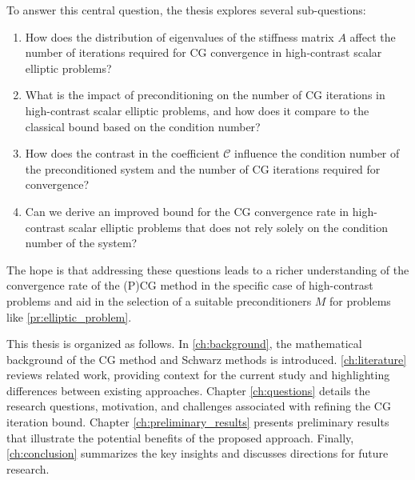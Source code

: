 To answer this central question, the thesis explores several sub-questions:
\begin{enumerate}
    \item How does the distribution of eigenvalues of the stiffness matrix \( A \) affect the number of iterations required for CG convergence in high-contrast scalar elliptic problems?
    \item What is the impact of preconditioning on the number of CG iterations in high-contrast scalar elliptic problems, and how does it compare to the classical bound based on the condition number?
    \item How does the contrast in the coefficient \( \mathcal{C} \) influence the condition number of the preconditioned system and the number of CG iterations required for convergence?
    \item Can we derive an improved bound for the CG convergence rate in high-contrast scalar elliptic problems that does not rely solely on the condition number of the system?
\end{enumerate}

The hope is that addressing these questions leads to a richer understanding of the convergence rate of the (P)CG method in the specific case of high-contrast problems and aid in the selection of a suitable preconditioners $M$ for problems like \cref{pr:elliptic_problem}.

This thesis is organized as follows. In \cref{ch:background}, the mathematical background of the CG method and Schwarz methods is introduced. \cref{ch:literature} reviews related work, providing context for the current study and highlighting differences between existing approaches. Chapter \ref{ch:questions} details the research questions, motivation, and challenges associated with refining the CG iteration bound. Chapter \ref{ch:preliminary_results} presents preliminary results that illustrate the potential benefits of the proposed approach. Finally, \cref{ch:conclusion} summarizes the key insights and discusses directions for future research.
